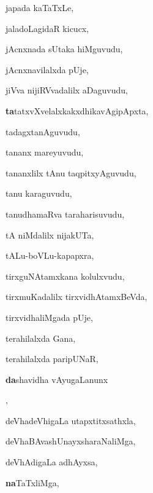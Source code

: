 \begin{multicols}{3}
{\noindent
{japada kaTaTxLe}, \pageref{japada kaTaTxLe}

\noindent
{jaladoLagidaR kicucx}, \pageref{jaladoLagidaR kicucx}

\noindent
{jAcnxnada sUtaka hiMguvudu}, \pageref{jAcnxnada sUtaka hiMguvudu}

\noindent
{jAcnxnavilalxda pUje}, \pageref{jAcnxnavilalxda pUje}

\noindent
{jiVva nijiRVvadalilx aDaguvudu}, \pageref{jiVva nijiRVvadalilx aDaguvudu}

\noindent
{{\large\textbf{ta}}tatxvXvelalxkakxdhikavAgipApxta}, \pageref{tatatxvXvelalxkakxdhikavAgipApxta}

\noindent
{tadagxtanAguvudu}, \pageref{tadagxtanAguvudu}

\noindent
{tananx mareyuvudu}, \pageref{tananx mareyuvudu}

\noindent
{tananxlilx tAnu taqpitxyAguvudu}, \pageref{tananxlilx tAnu taqpitxyAguvudu}

\noindent
{tanu karaguvudu}, \pageref{tanu karaguvudu}

\noindent
{tanudhamaRva taraharisuvudu}, \pageref{tanudhamaRva taraharisuvudu}

\noindent
{tA niMdalilx nijakUTa}, \pageref{tA niMdalilx nijakUTa}

\noindent
{tALu-boVLu-kapapxra}, \pageref{tALu-boVLu-kapapxra}

\noindent
{tirxguNAtamxkana kolulxvudu}, \pageref{tirxguNAtamxkana kolulxvudu}

\noindent
{tirxmuKadalilx tirxvidhAtamxBeVda}, \pageref{tirxmuKadalilx tirxvidhAtamxBeVda}

\noindent
{tirxvidhaliMgada pUje}, \pageref{tirxvidhaliMgada pUje}

\noindent
{terahilalxda Gana}, \pageref{terahilalxda Gana}

\noindent
{terahilalxda paripUNaR}, \pageref{terahilalxda paripUNaR}

\noindent
{{\large\textbf{da}}shavidha vAyugaLanunx}

\noindent
{}, \pageref{dashavidha vAyugaLanunx nililxsuvudu}

\noindent
{deVhadeVhigaLa utapxtitxsathxla}, \pageref{deVhadeVhigaLa utapxtitxsathxla}

\noindent
{deVhaBAvashUnayxsharaNaliMga}, \pageref{deVhaBAvashUnayxsharaNaliMga}

\noindent
{deVhAdigaLa adhAyxsa}, \pageref{deVhAdigaLa adhAyxsa}

\noindent
{{\large\textbf{na}}TaTxliMga}, \pageref{naTaTxliMga}

}
\end{multicols}
